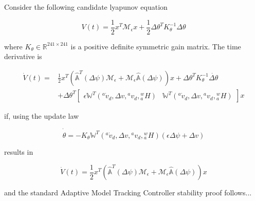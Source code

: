 \noindent Consider the following candidate lyapunov equation

\begin{equation} \label{chUV_AMTC.eq.lyap_adapt}
V(t)=\frac{1}{2} x^T\mathcal{M}_\epsilon x 
    +\frac{1}{2}\Delta\theta^T K_\theta^{-1} \Delta \theta
\end{equation}

\noindent where $K_\theta\in\mathbb{R}^{241\times 241}$ is a positive
definite symmetric gain matrix.  The time derivative is

\begin{align}
\dot{V}(t)=&\frac{1}{2}
x^T\left(\hat{\mathbb{A}}^{T}(\Delta\psi)\mathcal{M}_\epsilon 
        +\mathcal{M}_\epsilon\hat{\mathbb{A}}(\Delta\psi)\right) x
        +\Delta\theta^T K_\theta^{-1} \dot{\Delta \theta}
\nonumber \\
&+\Delta \theta^T \left[\begin{array}{cc}
   \epsilon \mathbb{W}^{T}({^a}\dot{v}_d,\Delta v, {^a}v_d ,
      {^w_a}H) & \mathbb{W}^{T}({^a}\dot{v}_d,\Delta v, {^a}v_d ,
      {^w_a}H)
   \end{array} \right] x
 \label{chUV_AMTC.eq.lyap_dot_adapt}  
\end{align}

\noindent if, using the  update law

\begin{equation}
\dot{\hat{\theta}}=-K_\theta \mathbb{W}^T ({^a}\dot{v}_d,\Delta v, {^a}v_d ,
      {^w_a}H) (\epsilon \Delta \psi + \Delta v)
\end{equation}

\noindent results in 

\begin{equation}
\dot{V}(t)=\frac{1}{2}
x^T\left(\hat{\mathbb{A}}^{T}(\Delta\psi)\mathcal{M}_\epsilon 
        +\mathcal{M}_\epsilon\hat{\mathbb{A}}(\Delta\psi)\right) x
\end{equation}

\noindent and the standard Adaptive Model Tracking Controller stability proof follows...
